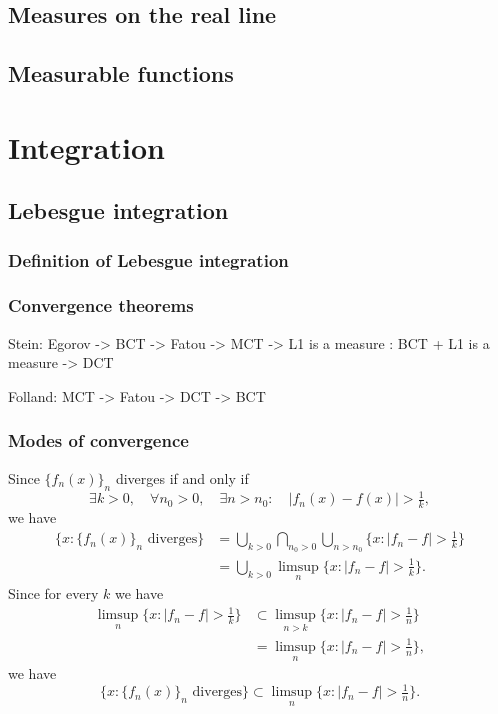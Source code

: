 \documentclass{../note}
\begin{document}
\chapter{Measures on the real line}



\chapter{Measurable functions}






\part{Integration}

\chapter{Lebesgue integration}
\section{Definition of Lebesgue integration}
\section{Convergence theorems}

Stein: Egorov -> BCT -> Fatou -> MCT -> L1 is a measure : BCT + L1 is a measure -> DCT

Folland: MCT -> Fatou -> DCT -> BCT

\section{Modes of convergence}

Since $\{f_n(x)\}_n$ diverges if and only if
\[\exists k>0,\quad\forall n_0>0,\quad\exists n>n_0:\quad|f_n(x)-f(x)|>\tfrac1k,\]
we have
\begin{align*}
\{x:\{f_n(x)\}_n\text{ diverges}\}
&=\bigcup_{k>0}\bigcap_{n_0>0}\bigcup_{n>n_0}\{x:|f_n-f|>\tfrac1k\}\\
&=\bigcup_{k>0}\limsup_n\{x:|f_n-f|>\tfrac1k\}.
\end{align*}
Since for every $k$ we have
\begin{align*}
\limsup_n\{x:|f_n-f|>\tfrac1k\}
&\subset\limsup_{n>k}\{x:|f_n-f|>\tfrac1n\}\\
&=\limsup_n\{x:|f_n-f|>\tfrac1n\},
\end{align*}
we have
\[\{x:\{f_n(x)\}_n\text{ diverges}\}\subset\limsup_n\{x:|f_n-f|>\tfrac1n\}.\]
\end{document}
